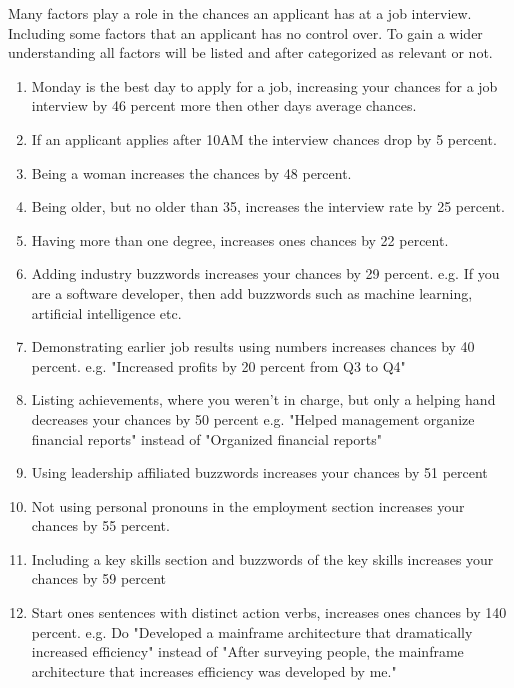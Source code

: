 Many factors play a role in the chances an applicant has at a job interview.
Including some factors that an applicant has no control over.
To gain a wider understanding all factors will be listed and after categorized as relevant or not. \\

\begin{enumerate}
   \item Monday is the best day to apply for a job, increasing your chances for a job interview by 46 percent more then other days average chances.
   \item If an applicant applies after 10AM the interview chances drop by 5 percent.
   \item Being a woman increases the chances by 48 percent.
   \item Being older, but no older than 35, increases the interview rate by 25 percent.
   \item Having more than one degree, increases ones chances by 22 percent.
   \item Adding industry buzzwords increases your chances by 29 percent.
      e.g. If you are a software developer, then add buzzwords such as machine learning,
      artificial intelligence etc.
   \item Demonstrating earlier job results using numbers increases chances by 40 percent.
      e.g. "Increased profits by 20 percent from Q3 to Q4"
   \item Listing achievements, where you weren't in charge, but only a helping hand
    decreases your chances by 50 percent
      e.g. "Helped management organize financial reports" instead of "Organized financial reports"
   \item Using leadership affiliated buzzwords increases your chances by 51 percent
   \item Not using personal pronouns in the employment section increases your
   chances by 55 percent.
   \item Including a key skills section and buzzwords of the key skills increases your
    chances by 59 percent
   \item Start ones sentences with distinct action verbs, increases ones chances by 140 percent.
      e.g. Do "Developed a mainframe architecture that dramatically increased efficiency"
      instead of "After surveying people, the mainframe architecture that increases efficiency was
      developed by me."\cite{Science_job}
   \end{enumerate}

